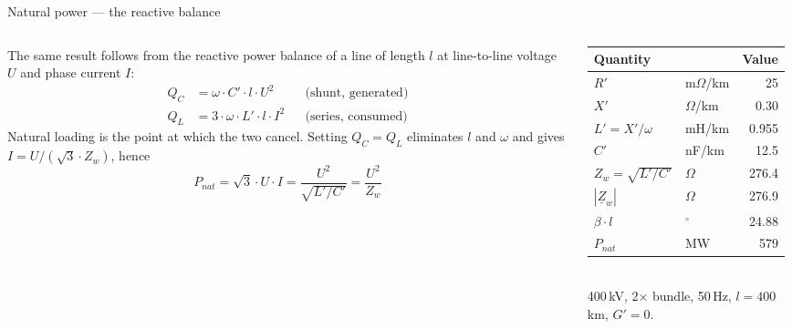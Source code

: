 \begin{frame}{Natural power --- the reactive balance}
  \begin{columns}[T,onlytextwidth]
    \begin{column}{0.52\textwidth}
      {\small The same result follows from the reactive power balance of a line
      of length $l$ at line-to-line voltage $U$ and phase current $I$:}
      \[ \begin{aligned}
        Q_C &= \omega\cdot C'\cdot l\cdot U^2 && \text{(shunt, generated)}\\[0.15em]
        Q_L &= 3\cdot\omega\cdot L'\cdot l\cdot I^2 && \text{(series, consumed)}
      \end{aligned} \]
      {\small Natural loading is the point at which the two cancel. Setting
      $Q_C=Q_L$ eliminates $l$ and $\omega$ and gives
      $I=U/\!\left(\sqrt{3}\cdot Z_w\right)$, hence}
      \[ \boxed{\;P_{nat} = \sqrt{3}\cdot U\cdot I
                = \frac{U^2}{\sqrt{L'/C'}} = \frac{U^2}{Z_w}\;} \]
    \end{column}
    \begin{column}{0.45\textwidth}
      \renewcommand{\arraystretch}{1.15}
      {\footnotesize
      \begin{tabular}{@{}l l r@{}}
        \textbf{Quantity} & & \textbf{Value} \\
        \hline
        $R'$ & m$\Omega$/km & 25 \\
        $X'$ & $\Omega$/km  & 0.30 \\
        $L'=X'/\omega$ & mH/km & 0.955 \\
        $C'$ & nF/km & 12.5 \\
        \hline
        $Z_w=\sqrt{L'/C'}$ & $\Omega$ & 276.4 \\
        $\left|\underline{Z}_w\right|$ & $\Omega$ & 276.9 \\
        $\beta\cdot l$ & $^\circ$ & 24.88 \\
        \hline
        $P_{nat}$ & MW & 579 \\
        \hline
      \end{tabular}}\\[0.4em]
      {\color{atGray}\footnotesize 400\,kV, 2$\times$ bundle, 50\,Hz,
      $l=400$\,km, $G'=0$.}
    \end{column}
  \end{columns}
\end{frame}

